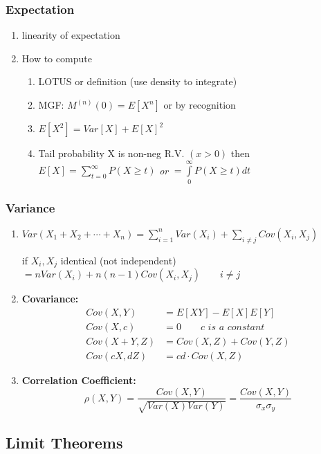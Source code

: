 \subsubsection*{Expectation}
\begin{enumerate}[label=\protect\circled{\arabic*}]
	\item linearity of expectation
	\item How to compute
	\begin{enumerate}
		\item LOTUS or definition (use density to integrate)
		\item MGF: $M^{(n)}(0) = E[X^n]$ or by recognition
		\item $E[X^2] = Var[X] + E[X]^2$
		\item Tail probability X is non-neg R.V. $(x>0)$ then $E[X] = \sum\limits_{t=0}^\infty P(X \geq t)$ \textit{or} $= \int\limits_0^\infty P(X \geq t) dt$
	\end{enumerate}
\end{enumerate}
\subsubsection*{Variance}
\begin{enumerate}[label=\protect\circled{\arabic*}]
	\item $Var(X_1 + X_2 + \cdots + X_n) = \sum\limits_{i=1}^n Var(X_i) + \sum\limits_{i \neq j} Cov(X_i, X_j)$
	\begin{center}
		if $X_i, X_j$ identical (not independent) $ = n Var(X_i) + n(n-1)Cov(X_i, X_j) \quad \quad i\neq j$
	\end{center}
	\item \textbf{Covariance: }
	\begin{align*}
		Cov(X,Y) & = E[XY] - E[X]E[Y]\\
		Cov(X,c) & = 0 \quad \quad c \textit{ is a constant}\\
		Cov(X+Y,Z) & = Cov(X,Z) + Cov(Y,Z)\\
		Cov(cX,dZ) & = cd \cdot Cov(X,Z) 
	\end{align*}
	\item \textbf{Correlation Coefficient:}
	\begin{equation*}
		\rho(X,Y) = \frac{Cov(X,Y)}{\sqrt{Var(X) Var(Y)}} = \frac{Cov(X,Y)}{\sigma_x \sigma_y}
	\end{equation*}
\end{enumerate}
\subsection*{Limit Theorems}
